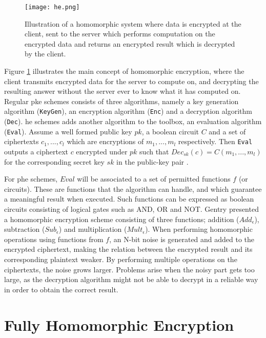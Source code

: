 \begin{figure}[h]
	\centering
	\texttt{[image: he.png]}
	\caption{Illustration of a homomorphic system where data is encrypted at the client, sent to the server which performs computation on the encrypted data and returns an encrypted result which is decrypted by the client.}
	\label{fig:he_ill}
\end{figure}

Figure \ref{fig:he_ill} illustrates the main concept of homomorphic encryption, where the client transmits encrypted data for the server to compute on, and decrypting the resulting answer without the server ever to know what it has computed on. Regular \gls{pke} schemes consists of three algorithms, namely a key generation algorithm (\texttt{KeyGen}), an encryption algorithm (\texttt{Enc}) and a decryption algorithm (\texttt{Dec}). \gls{he} schemes adds another algorithm to the toolbox, an evaluation algorithm (\texttt{Eval}).  Assume a well formed public key $pk$, a boolean circuit $C$ and a set of ciphertexts $c_1, ..., c_l$ which are encryptions of $m_1, ..., m_l$ respectively. Then \texttt{Eval} outputs a ciphertext $c$ encrypted under $pk$ such that $Dec_{sk}(c) = C(m_1, ..., m_l)$ for the corresponding secret key $sk$ in the public-key pair \cite{damgaard2012secure}.


For \gls{phe} schemes, $Eval$ will be associated to a set of permitted functions $f$ (or circuits). These are functions that the algorithm can handle, and which guarantee a meaningful result when executed. Such functions can be expressed as boolean circuits consisting of logical gates such as AND, OR and NOT. Gentry \cite{Gentry_computing_arb_func_enc_data} presented a homomorphic encryption scheme consisting of three functions; addition ($Add_{\epsilon}$), subtraction ($Sub_{\epsilon}$) and multiplication ($Mult_{\epsilon}$). When performing homomorphic operations using functions from $f$, an N-bit noise is generated and added to the encrypted ciphertext, making the relation between the encrypted result and its corresponding plaintext weaker. By performing multiple operations on the ciphertexts, the noise grows larger. Problems arise when the noisy part gets too large, as the decryption algorithm might not be able to decrypt in a reliable way in order to obtain the correct result.

\section{Fully Homomorphic Encryption}

